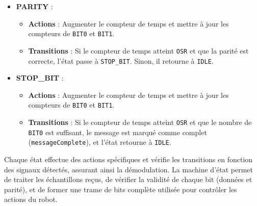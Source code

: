 \begin{itemize}
\begin{itemize}
        \item \textbf{PARITY} :
        \begin{itemize}
            \item \textbf{Actions} : Augmenter le compteur de temps et mettre à jour les compteurs de \texttt{BIT0} et \texttt{BIT1}.
            \item \textbf{Transitions} : Si le compteur de temps atteint \texttt{OSR} et que la parité est correcte, l'état passe à \texttt{STOP\_BIT}. Sinon, il retourne à \texttt{IDLE}.
        \end{itemize}
        
        \item \textbf{STOP\_BIT} :
        \begin{itemize}
            \item \textbf{Actions} : Augmenter le compteur de temps et mettre à jour les compteurs de \texttt{BIT0} et \texttt{BIT1}.
            \item \textbf{Transitions} : Si le compteur de temps atteint \texttt{OSR} et que le nombre de \texttt{BIT0} est suffisant, le message est marqué comme complet (\texttt{messageComplete}), et l'état retourne à \texttt{IDLE}.
        \end{itemize}
    \end{itemize}
\end{itemize}

Chaque état effectue des actions spécifiques et vérifie les transitions en fonction des signaux détectés, assurant ainsi la démodulation. La machine d'état permet de traiter les échantillons reçus, de vérifier la validité de chaque bit (données et parité), et de former une trame de bits complète utilisée pour contrôler les actions du robot.


